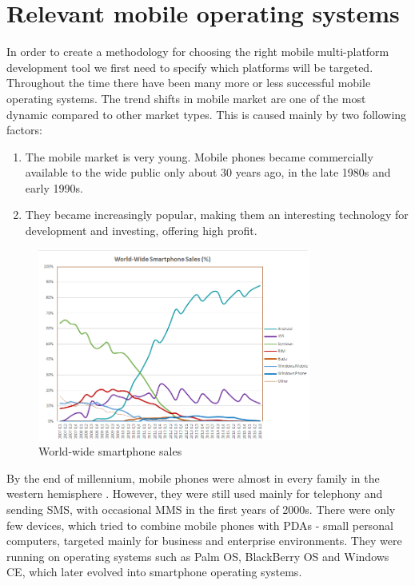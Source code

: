 \documentclass[english,master,public,dept460,male,cpdeclaration,oneside]{diploma}
\begin{document}
\section{Relevant mobile operating systems}
In order to create a methodology for choosing the right mobile multi-platform development tool we first need to specify which platforms will be targeted. Throughout the time there have been many more or less successful mobile operating systems. The trend shifts in mobile market are one of the most dynamic compared to other market types. This is caused mainly by two following factors:
\begin{enumerate}
	\item The mobile market is very young. Mobile phones became commercially available to the wide public only about 30 years ago, in the late 1980s and early 1990s. 
	\item They became increasingly popular, making them an interesting technology for development and investing, offering high profit. 
\end{enumerate}

\begin{figure}[!ht]
\centering\includegraphics[width=0.8\textwidth]{Figures/World_Wide_Smartphone_Sales_Share.png}
\caption{World-wide smartphone sales \cite{wikiSmartphoneSales}}
\label{figure:wikiSmrtphoneSales}
\end{figure}

By the end of millennium, mobile phones were almost in every family in the western hemisphere \cite{worldBank}. However, they were still used mainly for telephony and sending SMS, with occasional MMS in the first years of 2000s. There were only few devices, which tried to combine mobile phones with PDAs - small personal computers, targeted mainly for business and enterprise environments. They were running on operating systems such as Palm OS, BlackBerry OS and Windows CE, which later evolved into smartphone operating systems.
\end{document}
